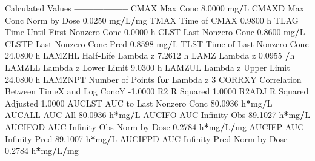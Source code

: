 \documentclass[12pt,]{krantz}
\newenvironment{Shaded}{\begin{snugshade}}{\end{snugshade}}
\newcommand{\ControlFlowTok}[1]{\textcolor[rgb]{0.13,0.29,0.53}{\textbf{#1}}}
\newcommand{\DecValTok}[1]{\textcolor[rgb]{0.00,0.00,0.81}{#1}}
\newcommand{\FloatTok}[1]{\textcolor[rgb]{0.00,0.00,0.81}{#1}}
\newcommand{\NormalTok}[1]{#1}
\newcommand{\OperatorTok}[1]{\textcolor[rgb]{0.81,0.36,0.00}{\textbf{#1}}}
\begin{document}
\begin{Shaded}
\begin{Highlighting}[]
{{{{{{{{{{{{\NormalTok{Calculated Values}
\OperatorTok{-----------------}
\NormalTok{CMAX       Max Conc                                        }\FloatTok{8.0000}\NormalTok{ mg}\OperatorTok{/}\NormalTok{L}
\NormalTok{CMAXD      Max Conc Norm by Dose                           }\FloatTok{0.0250}\NormalTok{ mg}\OperatorTok{/}\NormalTok{L}\OperatorTok{/}\NormalTok{mg}
\NormalTok{TMAX       Time of CMAX                                    }\FloatTok{0.9800}\NormalTok{ h}
\NormalTok{TLAG       Time Until First Nonzero Conc                   }\FloatTok{0.0000}\NormalTok{ h}
\NormalTok{CLST       Last Nonzero Conc                               }\FloatTok{0.8600}\NormalTok{ mg}\OperatorTok{/}\NormalTok{L}
\NormalTok{CLSTP      Last Nonzero Conc Pred                          }\FloatTok{0.8598}\NormalTok{ mg}\OperatorTok{/}\NormalTok{L}
\NormalTok{TLST       Time of Last Nonzero Conc                      }\FloatTok{24.0800}\NormalTok{ h}
\NormalTok{LAMZHL     Half}\OperatorTok{-}\NormalTok{Life Lambda z                              }\FloatTok{7.2612}\NormalTok{ h}
\NormalTok{LAMZ       Lambda z                                        }\FloatTok{0.0955} \OperatorTok{/}\NormalTok{h}
\NormalTok{LAMZLL     Lambda z Lower Limit                            }\FloatTok{9.0300}\NormalTok{ h}
\NormalTok{LAMZUL     Lambda z Upper Limit                           }\FloatTok{24.0800}\NormalTok{ h}
\NormalTok{LAMZNPT    Number of Points }\ControlFlowTok{for}\NormalTok{ Lambda z                   }\DecValTok{3}
\NormalTok{CORRXY     Correlation Between TimeX and Log ConcY        }\FloatTok{-1.0000} 
\NormalTok{R2         R Squared                                       }\FloatTok{1.0000} 
\NormalTok{R2ADJ      R Squared Adjusted                              }\FloatTok{1.0000} 
\NormalTok{AUCLST     AUC to Last Nonzero Conc                       }\FloatTok{80.0936}\NormalTok{ h}\OperatorTok{*}\NormalTok{mg}\OperatorTok{/}\NormalTok{L}
\NormalTok{AUCALL     AUC All                                        }\FloatTok{80.0936}\NormalTok{ h}\OperatorTok{*}\NormalTok{mg}\OperatorTok{/}\NormalTok{L}
\NormalTok{AUCIFO     AUC Infinity Obs                               }\FloatTok{89.1027}\NormalTok{ h}\OperatorTok{*}\NormalTok{mg}\OperatorTok{/}\NormalTok{L}
\NormalTok{AUCIFOD    AUC Infinity Obs Norm by Dose                   }\FloatTok{0.2784}\NormalTok{ h}\OperatorTok{*}\NormalTok{mg}\OperatorTok{/}\NormalTok{L}\OperatorTok{/}\NormalTok{mg}
\NormalTok{AUCIFP     AUC Infinity Pred                              }\FloatTok{89.1007}\NormalTok{ h}\OperatorTok{*}\NormalTok{mg}\OperatorTok{/}\NormalTok{L}
\NormalTok{AUCIFPD    AUC Infinity Pred Norm by Dose                  }\FloatTok{0.2784}\NormalTok{ h}\OperatorTok{*}\NormalTok{mg}\OperatorTok{/}\NormalTok{L}\OperatorTok{/}\NormalTok{mg}
}}}}}}}}}}}}
\end{Highlighting}
\end{Shaded}
\end{document}
